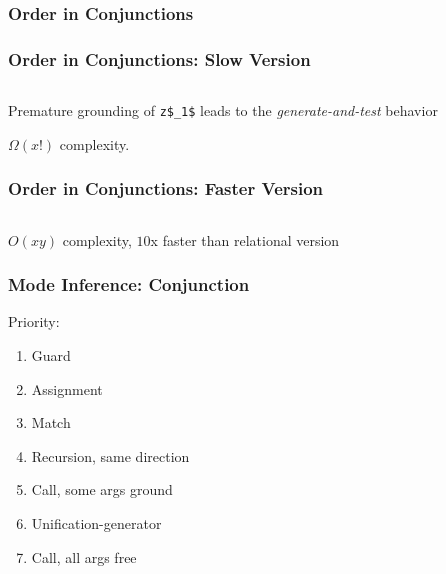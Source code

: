 \documentclass[xcolor=table, aspectratio=169]{beamer}
\begin{document}
\begin{frame}[fragile]
  \frametitle{Order in Conjunctions}

\end{frame}


\begin{frame}[fragile]
  \frametitle{Order in Conjunctions: Slow Version}
\begin{columns}
  \begin{column}[t]{0.4\textwidth}
    
  \end{column}
  \begin{column}[t]{0.55\textwidth}
    
  \end{column}
\end{columns}

\begin{center}
  Premature grounding of \lstinline{z$_1$} leads to the \emph{generate-and-test} behavior

  $\Omega(x!)$ complexity.
\end{center}

\end{frame}


\begin{frame}[fragile]
  \frametitle{Order in Conjunctions: Faster Version}

\begin{columns}
  \begin{column}[t]{0.4\textwidth}
    
  \end{column}
  \begin{column}[t]{0.55\textwidth}
    
  \end{column}
\end{columns}
\begin{center}
    $O(xy)$ complexity, $10$x faster than relational version
\end{center}
\end{frame}

\begin{frame}[fragile]
  \frametitle{Mode Inference: Conjunction}
\begin{center}
Priority:
\end{center}

\vfill

\begin{center}
  \begin{minipage}{0.4\textwidth}
    \begin{enumerate}
      \item Guard
      \item Assignment
      \item Match
      \item Recursion, same direction
      \item Call, some args ground
      \item Unification-generator
      \item Call, all args free
    \end{enumerate}
  \end{minipage}
\end{center}


\end{frame}
\end{document}
